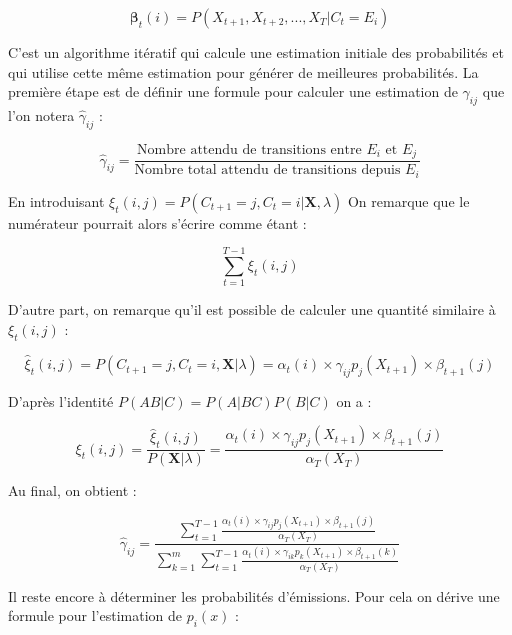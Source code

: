 \documentclass[12pt]{report}
\begin{document}
\begin{equation}
\bm{\beta}_t(i) = P(X_{t+1},X_{t+2},...,X_{T}|C_t=E_i)
\label{eq::HMM:BackwardProb}
\end{equation}

C'est un algorithme itératif qui calcule une estimation initiale des probabilités et qui utilise cette même estimation pour générer de meilleures probabilités. La première étape est de définir une formule pour calculer une estimation de $\gamma_{ij}$ que l'on notera $\hat{\gamma}_{ij}$ :

\begin{equation}
\hat{\gamma}_{ij} = \frac{\text{Nombre attendu de transitions entre } E_i \text{ et } E_j}{\text{Nombre total attendu de transitions depuis }E_i}
\end{equation}

En introduisant $\xi_t(i,j) = P(C_{t+1}=j,C_t=i|\bm{X},\lambda)$  On remarque que le numérateur pourrait alors s'écrire comme étant :

\begin{equation}
\sum\limits_{t=1}^{T-1} \xi_t(i,j) 
\end{equation}

D'autre part, on remarque qu'il est possible de calculer une quantité similaire à $\xi_t(i,j)$ :

\begin{equation}
\hat{\xi}_t(i,j) = P(C_{t+1}=j,C_t=i,\bm{X}|\lambda) = \alpha_t(i) \times \gamma_{ij} p_j(X_{t+1}) \times \beta_{t+1}(j)
\end{equation}

D'après l'identité $P(AB|C)=P(A|BC)P(B|C)$ on a :

\begin{equation}
\xi_t(i,j) = \frac{\hat{\xi}_t(i,j)}{P(\bm{X}|\lambda)} = \frac{\alpha_t(i) \times \gamma_{ij} p_j(X_{t+1}) \times \beta_{t+1}(j)}{\alpha_T(X_T)}
\end{equation}

Au final, on obtient :

\begin{equation}
\hat{\gamma}_{ij} = 
\frac{\sum\limits_{t=1}^{T-1} \frac{\alpha_t(i) \times \gamma_{ij} p_j(X_{t+1}) \times \beta_{t+1}(j)}
	{\alpha_T(X_T)}}
{\sum\limits_{k=1}^m \sum\limits_{t=1}^{T-1} \frac{\alpha_t(i) \times \gamma_{ik} p_k(X_{t+1}) \times \beta_{t+1}(k)}	   {\alpha_T(X_T)}}
\end{equation}

Il reste encore à déterminer les probabilités d'émissions. Pour cela on dérive une formule pour l'estimation de $p_i(x)$ : 
\end{document}

